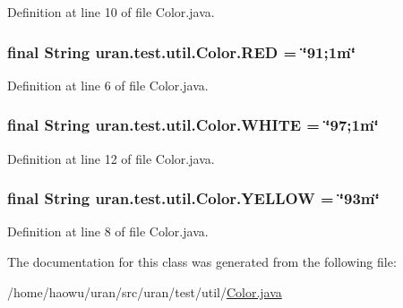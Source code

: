 Definition at line 10 of file Color.\+java.

\hypertarget{classuran_1_1test_1_1util_1_1_color_a7b82d8a5edcacd707d0635fd76729bd0}{}
\subsubsection[{R\+E\+D}]{\setlength{\rightskip}{0pt plus 5cm}final String uran.\+test.\+util.\+Color.\+R\+E\+D = \char`\"{}91;1m\char`\"{}\hspace{0.3cm}{\ttfamily [static]}}\label{classuran_1_1test_1_1util_1_1_color_a7b82d8a5edcacd707d0635fd76729bd0}


Definition at line 6 of file Color.\+java.

\hypertarget{classuran_1_1test_1_1util_1_1_color_a44ada8df1da64ed443e420cf6a6cbbd8}{}
\subsubsection[{W\+H\+I\+T\+E}]{\setlength{\rightskip}{0pt plus 5cm}final String uran.\+test.\+util.\+Color.\+W\+H\+I\+T\+E = \char`\"{}97;1m\char`\"{}\hspace{0.3cm}{\ttfamily [static]}}\label{classuran_1_1test_1_1util_1_1_color_a44ada8df1da64ed443e420cf6a6cbbd8}


Definition at line 12 of file Color.\+java.

\hypertarget{classuran_1_1test_1_1util_1_1_color_a7b786075805d569ab175e9f39992bf7e}{}
\subsubsection[{Y\+E\+L\+L\+O\+W}]{\setlength{\rightskip}{0pt plus 5cm}final String uran.\+test.\+util.\+Color.\+Y\+E\+L\+L\+O\+W = \char`\"{}93m\char`\"{}\hspace{0.3cm}{\ttfamily [static]}}\label{classuran_1_1test_1_1util_1_1_color_a7b786075805d569ab175e9f39992bf7e}


Definition at line 8 of file Color.\+java.



The documentation for this class was generated from the following file\+:\begin{DoxyCompactItemize}
\item 
/home/haowu/uran/src/uran/test/util/\hyperlink{src_2uran_2test_2util_2_color_8java}{Color.\+java}\end{DoxyCompactItemize}
